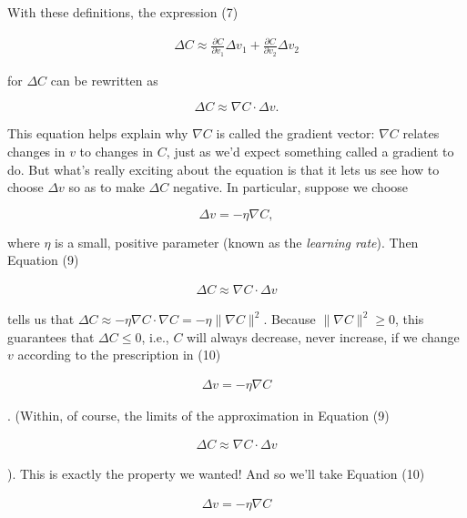 With these definitions, the expression (7)

\begin{align*}
\Delta C \approx \frac{\partial C}{\partial v_1} \Delta v_1 + \frac{\partial C}{\partial v_2} \Delta v_2 \nonumber
\end{align*}

\noindent for $\Delta C$ can be rewritten as

\begin{equation}
\Delta C \approx \nabla C \cdot \Delta v.
\tag{9}
\end{equation}

\noindent This equation helps explain why $\nabla C$ is called the gradient vector: $\nabla C$ relates changes in $v$ to changes in $C$, just as we'd expect something called a gradient to do. But what's really exciting about the equation is that it lets us see how to choose $\Delta v$ so as to make $\Delta C$ negative. In particular, suppose we choose

\begin{equation}
\Delta v = -\eta \nabla C,
\tag{10}
\end{equation}

\noindent where $\eta$ is a small, positive parameter (known as the \emph{learning rate}). Then Equation (9)

\begin{align*}
\Delta C \approx \nabla C \cdot \Delta v \nonumber
\end{align*}

\noindent tells us that $\Delta C \approx -\eta \nabla C \cdot \nabla C = -\eta \|\nabla C\|^2$. Because $\| \nabla C \|^2 \geq 0$, this guarantees that $\Delta C \leq 0$, i.e., $C$ will always decrease, never increase, if we change $v$ according to the prescription in (10)

\begin{align*}
\Delta v = -\eta \nabla C \nonumber
\end{align*}

\noindent. (Within, of course, the limits of the approximation in Equation (9)

\begin{align*}
\Delta C \approx \nabla C \cdot \Delta v \nonumber
\end{align*}

\noindent ). This is exactly the property we wanted! And so we'll take Equation (10)

\begin{align*}
\Delta v = -\eta \nabla C \nonumber
\end{align*}

